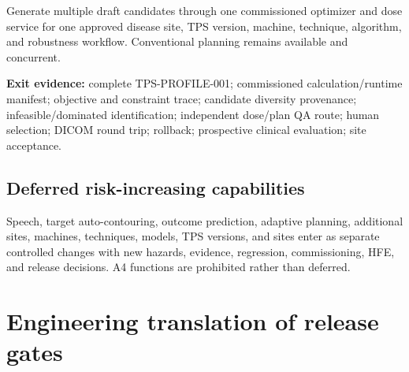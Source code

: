 \documentclass[11pt,letterpaper]{article}
\begin{document}
Generate multiple draft candidates through one commissioned optimizer and dose service for one approved disease site, TPS version, machine, technique, algorithm, and robustness workflow. Conventional planning remains available and concurrent.

\textbf{Exit evidence:} complete TPS-PROFILE-001; commissioned calculation/runtime manifest; objective and constraint trace; candidate diversity provenance; infeasible/dominated identification; independent dose/plan QA route; human selection; DICOM round trip; rollback; prospective clinical evaluation; site acceptance.

\subsection{Deferred risk-increasing capabilities}

Speech, target auto-contouring, outcome prediction, adaptive planning, additional sites, machines, techniques, models, TPS versions, and sites enter as separate controlled changes with new hazards, evidence, regression, commissioning, HFE, and release decisions. A4 functions are prohibited rather than deferred.

\section{Engineering translation of release gates}
\end{document}

